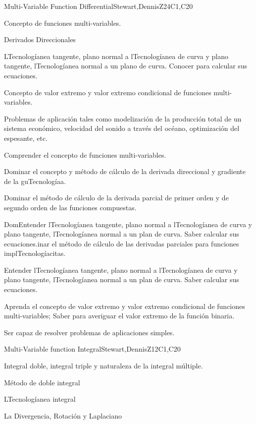 \begin{syllabus}
\begin{unit}{Multi-Variable Function Differential}{}{Stewart,DennisZ}{24}{C1,C20}
   \begin{topics}      
    \item Concepto de funciones multi-variables.
    \item Derivados Direccionales
    \item LTecnologíanea tangente, plano normal a lTecnologíanea de curva y plano tangente, lTecnologíanea normal a un plano de curva. Conocer para calcular sus ecuaciones.
    \item Concepto de valor extremo y valor extremo condicional de funciones multi-variables.
    \item Problemas de aplicación tales como modelización de la producción total de un sistema económico, velocidad del sonido a través del océano, optimización del espesante, etc.
      \end{topics}

   \begin{learningoutcomes}
    \item Comprender el concepto de funciones multi-variables.
    \item Dominar el concepto y método de cálculo de la derivada direccional y gradiente de la guTecnologíaa.
    \item Dominar el método de cálculo de la derivada parcial de primer orden y de segundo orden de las funciones compuestas.
    \item DomEntender lTecnologíanea tangente, plano normal a lTecnologíanea de curva y plano tangente, lTecnologíanea normal a un plan de curva. Saber calcular sus ecuaciones.inar el método de cálculo de las derivadas parciales para funciones implTecnologíacitas.
    \item Entender lTecnologíanea tangente, plano normal a lTecnologíanea de curva y plano tangente, lTecnologíanea normal a un plan de curva. Saber calcular sus ecuaciones.
    \item Aprenda el concepto de valor extremo y valor extremo condicional de funciones multi-variables; Saber para averiguar el valor extremo de la función binaria.
    \item Ser capaz de resolver problemas de aplicaciones simples.
    \end{learningoutcomes}
\end{unit}

\begin{unit}{Multi-Variable function Integral}{}{Stewart,DennisZ}{12}{C1,C20}
  \begin{topics}
    \item Integral doble, integral triple y naturaleza de la integral múltiple.
    \item Método de doble integral
    \item LTecnologíanea integral
    \item La Divergencia, Rotación y Laplaciano
   \end{topics}
  

\end{unit}
\end{syllabus}
